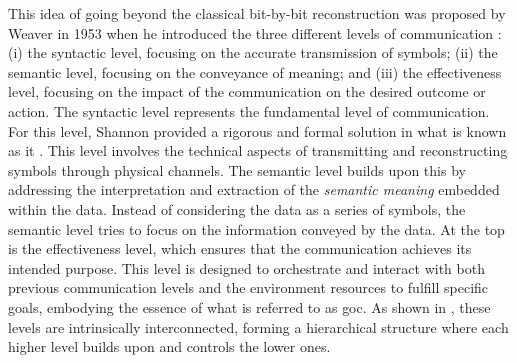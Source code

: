 This idea of going beyond the classical bit-by-bit reconstruction was proposed by Weaver in 1953 when he introduced the three different levels of communication \cite{WARREN1953semantic}: (i) the syntactic level, focusing on the accurate transmission of symbols; (ii) the semantic level, focusing on the conveyance of meaning; and (iii) the effectiveness level, focusing on the impact of the communication on the desired outcome or action. The syntactic level represents the fundamental level of communication. For this level, Shannon provided a rigorous and formal solution in what is known as \gls{it} \cite{Shannon1948Communication}. This level involves the technical aspects of transmitting and reconstructing symbols through physical channels. The semantic level builds upon this by addressing the interpretation and extraction of the \textit{semantic meaning} embedded within the data. Instead of considering the data as a series of symbols, the semantic level tries to focus on the information conveyed by the data. At the top is the effectiveness level, which ensures that the communication achieves its intended purpose. This level is designed to orchestrate and interact with both previous communication levels and the environment resources to fulfill specific goals, embodying the essence of what is referred to as \gls{goc}. 
As shown in , these levels are intrinsically interconnected, forming a hierarchical structure where each higher level builds upon and controls the lower ones.

